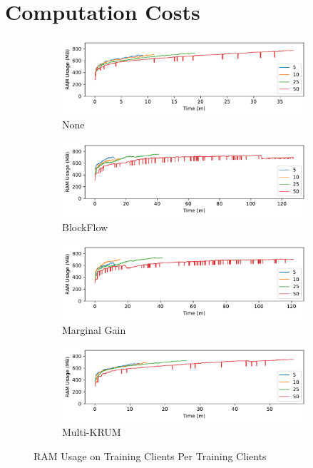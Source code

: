 \section{Computation Costs}

\begin{figure}[!ht]
    \centering
    \begin{subfigure}[b]{0.49\textwidth}
        \centering
        \includegraphics[width=\textwidth]{graphics/clients/ram_none_client.pdf}
        \caption{None}
    \end{subfigure}
    \hfill
    \begin{subfigure}[b]{0.49\textwidth}
        \centering
        \includegraphics[width=\textwidth]{graphics/clients/ram_blockflow_client.pdf}
        \caption{BlockFlow}
    \end{subfigure}
    \hfill
    \begin{subfigure}[b]{0.49\textwidth}
        \centering
        \includegraphics[width=\textwidth]{graphics/clients/ram_marginalgain_client.pdf}
        \caption{Marginal Gain}
    \end{subfigure}
    \hfill
    \begin{subfigure}[b]{0.49\textwidth}
        \centering
        \includegraphics[width=\textwidth]{graphics/clients/ram_multikrum_client.pdf}
        \caption{Multi-KRUM}
    \end{subfigure}
    \caption{RAM Usage on Training Clients Per Training Clients}
    \label{fig:ram_clients_degree_clients}
\end{figure}

